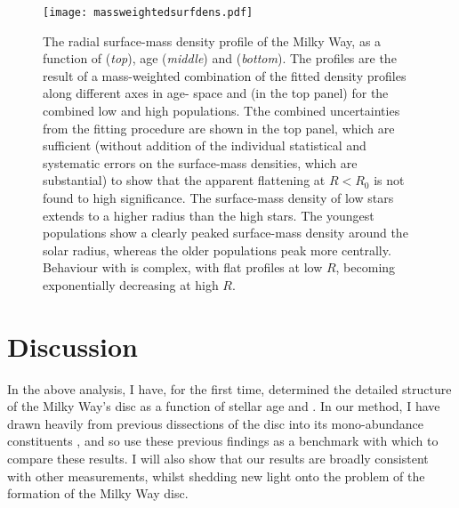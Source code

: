 \begin{figure}
 	\texttt{[image: massweightedsurfdens.pdf]}
 	\centering
     \caption[The best fit model for the true radial surface density profile of the Milky Way, as a function of age, \feh{} and \afe{} using mono-age mono-\feh{} populations in APOGEE DR12]{The radial surface-mass density profile of the Milky Way, as a function of \afe{} (\emph{top}), age (\emph{middle}) and \feh{} (\emph{bottom}). The profiles are the result of a mass-weighted combination of the fitted density profiles along different axes in age-\feh{} space and (in the top panel) for the combined low and high \afe{} populations. Tthe combined uncertainties from the fitting procedure are shown in the top panel, which are sufficient (without addition of the individual statistical and systematic errors on the surface-mass densities, which are substantial) to show that the apparent flattening at $R < R_0$ is not found to high significance. The surface-mass density of low \afe{} stars extends to a higher radius than the high \afe{} stars. The youngest populations show a clearly peaked surface-mass density around the solar radius, whereas the older populations peak more centrally. Behaviour with \feh{} is complex, with flat profiles at low $R$, becoming exponentially decreasing at high $R$.}
    \label{fig:profcombo}
 \end{figure}

 \section{Discussion}
 \label{sec:discussiona}
 In the above analysis, I have, for the first time, determined the detailed structure of the Milky Way's disc as a function of stellar age and \feh{}. In our method, I have drawn heavily from previous dissections of the disc into its mono-abundance constituents \citep[MAPs;][]{2012ApJ...753..148B,2016ApJ...823...30B}, and so use these previous findings as a benchmark with which to compare these results. I will also show that our results are broadly consistent with other measurements, whilst shedding new light onto the problem of the formation of the Milky Way disc.


